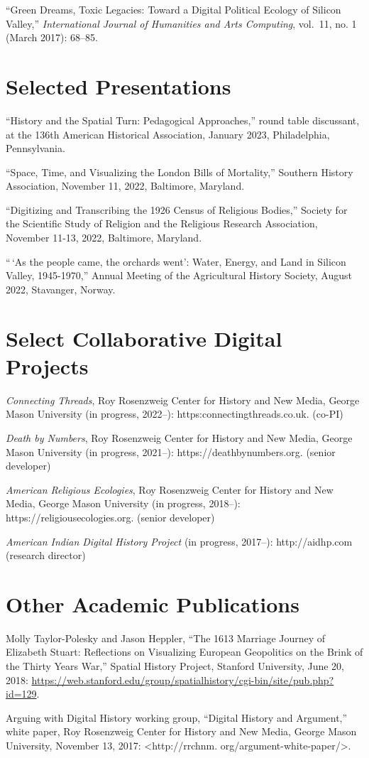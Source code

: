 ``Green Dreams, Toxic Legacies: Toward a Digital Political Ecology of
Silicon Valley,'' \emph{International Journal of Humanities and Arts
Computing}, vol.~11, no. 1 (March 2017): 68--85.

\section{Selected Presentations}\label{selected-presentations}

``History and the Spatial Turn: Pedagogical Approaches,'' round table
discussant, at the 136th American Historical Association, January 2023,
Philadelphia, Pennsylvania.

``Space, Time, and Visualizing the London Bills of Mortality,'' Southern
History Association, November 11, 2022, Baltimore, Maryland.

``Digitizing and Transcribing the 1926 Census of Religious Bodies,''
Society for the Scientific Study of Religion and the Religious Research
Association, November 11-13, 2022, Baltimore, Maryland.

``\,`As the people came, the orchards went': Water, Energy, and Land in
Silicon Valley, 1945-1970,'' Annual Meeting of the Agricultural History
Society, August 2022, Stavanger, Norway.

\section{Select Collaborative Digital
Projects}\label{select-collaborative-digital-projects}

\emph{Connecting Threads}, Roy Rosenzweig Center for History and New
Media, George Mason University (in progress, 2022--):
https:connectingthreads.co.uk. (co-PI)

\emph{Death by Numbers}, Roy Rosenzweig Center for History and New
Media, George Mason University (in progress, 2021--):
https://deathbynumbers.org. (senior developer)

\emph{American Religious Ecologies}, Roy Rosenzweig Center for History
and New Media, George Mason University (in progress, 2018--):
https://religiousecologies.org. (senior developer)

\emph{American Indian Digital History Project} (in progress, 2017--):
http://aidhp.com (research director)

\section{Other Academic Publications}\label{other-academic-publications}

Molly Taylor-Polesky and Jason Heppler, ``The 1613 Marriage Journey of
Elizabeth Stuart: Reflections on Visualizing European Geopolitics on the
Brink of the Thirty Years War,'' Spatial History Project, Stanford
University, June 20, 2018:
\url{https://web.stanford.edu/group/spatialhistory/cgi-bin/site/pub.php?id=129}.

Arguing with Digital History working group, ``Digital History and
Argument,'' white paper, Roy Rosenzweig Center for History and New
Media, George Mason University, November 13, 2017:
\textless http://rrchnm. org/argument-white-paper/\textgreater.
